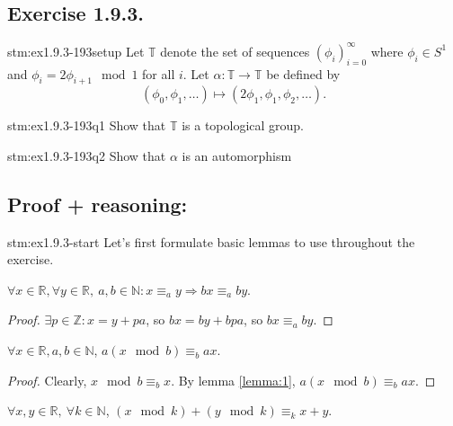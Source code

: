 \subsection*{Exercise 1.9.3.}

\begin{exercise}{stm:ex1.9.3-193setup}
Let $\mathbb{T}$ denote the set of sequences $(\phi_i)_{i=0}^{\infty}$ where $\phi_i \in S^1$ and $\phi_i = 2 \phi_{i+1} \mod 1$ for all $i$. Let $\alpha : \mathbb{T} \to \mathbb{T}$ be defined by 
\[
(\phi_0, \phi_1, \dots) \mapsto (2\phi_1, \phi_1, \phi_2, \dots).
\]
\end{exercise}
\begin{exercise}{stm:ex1.9.3-193q1}
Show that $\mathbb{T}$ is a topological group.
\end{exercise}

\begin{exercise}{stm:ex1.9.3-193q2}
Show that $\alpha$ is an automorphism
\end{exercise}
    

\subsection*{Proof {\color{blue} + reasoning}:}

\begin{explanation}{stm:ex1.9.3-start}
Let's first formulate basic lemmas to use throughout the exercise.
\end{explanation}

\begin{lemma}\label{lemma:1}
$\forall x \in \mathbb{R}, \forall y \in \mathbb{R}, \ a, b \in \mathbb{N} : x \equiv_a y \Rightarrow bx \equiv_{a} by$. 
\end{lemma}

\begin{proof}
$\exists p \in \mathbb{Z} : x = y + pa$, so $bx = by + bpa$, so $bx \equiv_{a} by$.
\end{proof}

\begin{lemma}\label{lemma:3}
$\forall x \in \mathbb{R}, a,b \in \mathbb{N}$, $a(x \mod b) \equiv_b ax$.
\end{lemma}

\begin{proof}
Clearly, $x \mod b \equiv_b x$. By lemma \ref{lemma:1}, $a(x \mod b) \equiv_b ax$.
\end{proof}

\begin{lemma}\label{lemma:4}
$\forall x, y \in \mathbb{R}, \ \forall k \in \mathbb{N}$, $( x \mod k ) + ( y \mod k ) \equiv_k x + y$.
\end{lemma}

